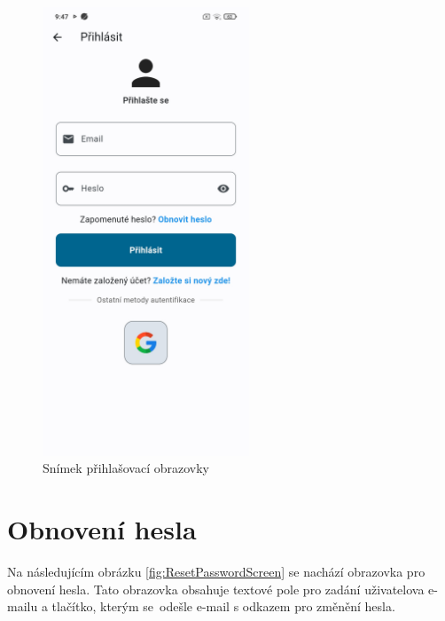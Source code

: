 \documentclass[czech, bc, kiv, he, iso690numb]{fasthesis}
\begin{document}
\begin{figure}[h!]
  \centering
  \includegraphics[width=0.55\textwidth]{img/BP-Runt/UserManual/LoginPage.jpg}
  \caption{Snímek přihlašovací obrazovky}
  \label{fig:LoginScreen}
\end{figure}

\section{Obnovení hesla}

Na následujícím obrázku \ref{fig:ResetPasswordScreen} se nachází obrazovka pro obnovení hesla. Tato obrazovka obsahuje textové pole pro zadání uživatelova e-mailu a tlačítko, kterým se~odešle e-mail s odkazem pro změnění hesla.
\end{document}

